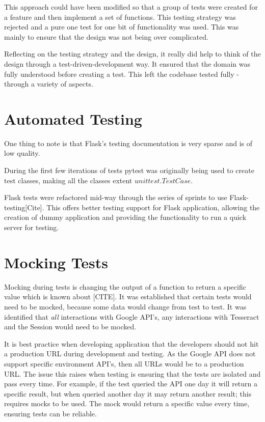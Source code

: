This approach could have been modified so that a group of tests were created for a feature and then implement a set of functions. This testing strategy was rejected and a pure one test for one bit of functionality was used. This was mainly to ensure that the design was not being over complicated.

Reflecting on the testing strategy and the design, it really did help to think of the design through a test-driven-development way. It ensured that the domain was fully understood before creating a test. This left the codebase tested fully - through a variety of aspects.
\section{Automated Testing}
One thing to note is that Flask's testing documentation is very sparse and is of low quality.

During the first few iterations of tests pytest was originally being used to create test classes, making all the classes extent $unittest.TestCase$.

Flask tests were refactored mid-way through the series of sprints to use Flask-testing[Cite]. This offers better testing support for Flask application, allowing the creation of dummy application and providing the functionality to run a quick server for testing.

\section{Mocking Tests}
Mocking during tests is changing the output of a function to return a specific value which is known about [CITE]. It was established that certain tests would need to be mocked, because some data would change from test to test. It was identified that \textit{all} interactions with Google API's, any interactions with Tesseract and the Session would need to be mocked.

It is best practice when developing application that the developers should not hit a production URL during development and testing. As the Google API does not support specific environment API's, then all URLs would be to a production URL. The issue this raises when testing is ensuring that the tests are isolated and pass every time. For example, if the test queried the API one day it will return a specific result, but when queried another day it may return another result; this requires  mocks to be used. The mock would return a specific value every time, ensuring tests can be reliable.

